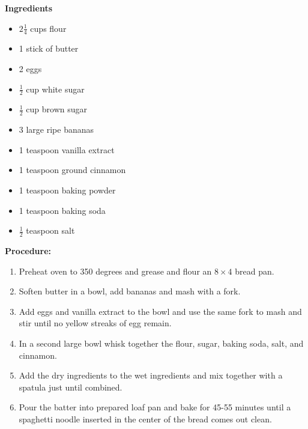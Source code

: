 \begin{multicols}{2}
\textbf{Ingredients}
\begin{itemize}
\item $2\frac{1}{4}$ cups flour
\item 1 stick of butter
\item 2 eggs  \quad
\item $\frac{1}{2}$ cup white sugar
\item $\frac{1}{2}$ cup brown sugar
\item 3 large ripe bananas
\item 1 teaspoon vanilla extract 
\item 1 teaspoon ground cinnamon
\item 1 teaspoon baking powder
\item 1 teaspoon baking soda 
\item $\frac{1}{2}$ teaspoon salt




\end{itemize}


\columnbreak
\textbf{Procedure:}
\medskip


\begin{enumerate}
\item Preheat oven to 350 degrees and grease and flour an $8\times4$ bread pan.

\item Soften butter in a bowl, add bananas and mash with a fork. 

\item Add eggs and vanilla extract to the bowl and use the same fork to mash and stir until no yellow streaks of egg remain.

\item In a second large bowl whisk together the flour, sugar, baking soda, salt, and cinnamon.

\item Add the dry ingredients to the wet ingredients and mix together with a spatula just until combined.

\item Pour the batter into prepared loaf pan and bake for 45-55 minutes until a spaghetti noodle inserted in the center of the bread comes out clean.

\end{enumerate}

\end{multicols}



